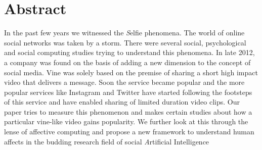 \section{Abstract}
In the past few years we witnessed the \textit Selfie phenomena. The world of online social networks was taken by a storm. There were several social, psychological and social computing studies trying to understand this phenomena. In late 2012, a company was found on the basis of adding a new dimension to the concept of social media. Vine was solely based on the premise of sharing a short high impact video that delivers a message. Soon the service became popular and the more popular services like Instagram and Twitter have started following the footsteps of this service and have enabled sharing of limited duration video clips. Our paper tries to measure this phenomenon and makes certain studies about how a particular vine-like video gains popularity. We further look at this through the lense of affective computing and propose a new framework to understand human affects in the budding research field of social \textit Artificial Intelligence
